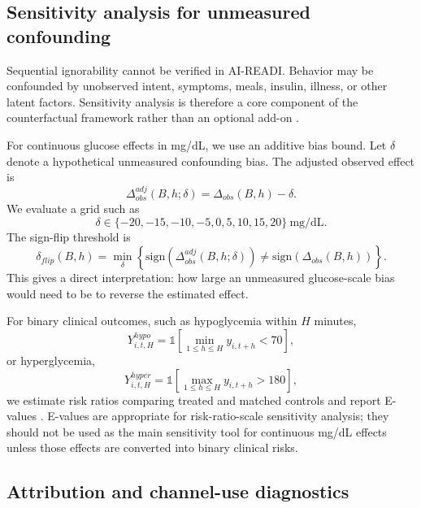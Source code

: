 \subsection{Sensitivity analysis for unmeasured confounding}
\label{subsec:sensitivity_analysis}

Sequential ignorability cannot be verified in AI-READI. Behavior may be confounded by unobserved intent, symptoms, meals, insulin, illness, or other latent factors. Sensitivity analysis is therefore a core component of the counterfactual framework rather than an optional add-on \citep{hernan2020whatif}.

For continuous glucose effects in mg/dL, we use an additive bias bound. Let $\delta$ denote a hypothetical unmeasured confounding bias. The adjusted observed effect is
\begin{equation}
    \Delta_{obs}^{adj}(B,h;\delta)
    = \Delta_{obs}(B,h) - \delta.
\end{equation}
We evaluate a grid such as
\begin{equation}
    \delta \in \{-20,-15,-10,-5,0,5,10,15,20\}\ \mathrm{mg/dL}.
\end{equation}
The sign-flip threshold is
\begin{equation}
    \delta_{flip}(B,h)=
    \min_{\delta}\left\{\mathrm{sign}(\Delta_{obs}^{adj}(B,h;\delta))\neq
    \mathrm{sign}(\Delta_{obs}(B,h))\right\}.
\end{equation}
This gives a direct interpretation: how large an unmeasured glucose-scale bias would need to be to reverse the estimated effect.

For binary clinical outcomes, such as hypoglycemia within $H$ minutes,
\begin{equation}
    Y^{hypo}_{i,t,H}=\mathbb{1}\left[\min_{1\leq h\leq H} y_{i,t+h}<70\right],
\end{equation}
or hyperglycemia,
\begin{equation}
    Y^{hyper}_{i,t,H}=\mathbb{1}\left[\max_{1\leq h\leq H} y_{i,t+h}>180\right],
\end{equation}
we estimate risk ratios comparing treated and matched controls and report E-values \citep{vanderweele2017evalue}. E-values are appropriate for risk-ratio-scale sensitivity analysis; they should not be used as the main sensitivity tool for continuous mg/dL effects unless those effects are converted into binary clinical risks.

\subsection{Attribution and channel-use diagnostics}
\label{subsec:attribution_diagnostics}

